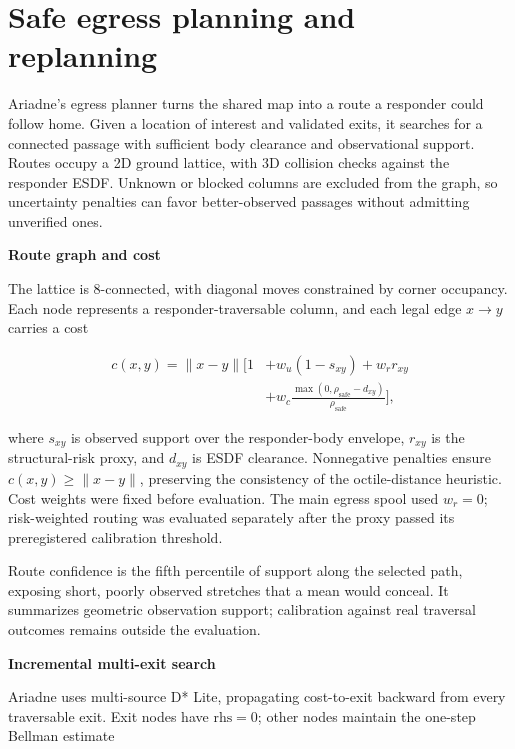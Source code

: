 \documentclass[10pt,a4paper]{article}
\newcommand{\indentedheading}[1]{\par\addvspace{0.65em}\noindent\hspace*{1em}\textbf{#1}\par\smallskip}
\begin{document}
\section{Safe egress planning and replanning}

Ariadne's egress planner turns the shared map into a route a responder
could follow home. Given a location of interest and validated exits,
it searches for a connected passage with sufficient body clearance
and observational support. Routes occupy a 2D ground lattice, with
3D collision checks against the responder ESDF. Unknown or blocked
columns are excluded from the graph, so uncertainty penalties can
favor better-observed passages without admitting unverified ones.

\indentedheading{Route graph and cost}

The lattice is 8-connected, with diagonal moves constrained by
corner occupancy. Each node represents a responder-traversable
column, and each legal edge $x\rightarrow y$ carries a cost

\begin{equation}
\begin{aligned}
c(x,y) = \|x-y\|\Bigg[
    1
    &+ w_u(1-s_{xy})
    + w_r r_{xy} \\
    &+ w_c
    \frac{\max(0,\rho_{\mathrm{safe}}-d_{xy})}
         {\rho_{\mathrm{safe}}}
\Bigg],
\end{aligned}
\label{eq:egress-cost}
\end{equation}

where $s_{xy}$ is observed support over the responder-body envelope,
$r_{xy}$ is the structural-risk proxy, and $d_{xy}$ is ESDF
clearance. Nonnegative penalties ensure $c(x,y)\geq\|x-y\|$,
preserving the consistency of the octile-distance heuristic.
Cost weights were fixed before evaluation. The main egress spool
used $w_r=0$; risk-weighted routing was evaluated separately after
the proxy passed its preregistered calibration threshold.

Route confidence is the fifth percentile of support along the
selected path, exposing short, poorly observed stretches that a
mean would conceal. It summarizes geometric observation support;
calibration against real traversal outcomes remains outside the
evaluation.

\indentedheading{Incremental multi-exit search}

Ariadne uses multi-source D* Lite, propagating cost-to-exit backward
from every traversable exit. Exit nodes have $\mathrm{rhs}=0$;
other nodes maintain the one-step Bellman estimate
\end{document}
